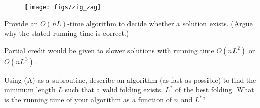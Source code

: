\begin{questions}[start=16]
{       \begin{figure}[h]
           \centering \texttt{[image: figs/zig\_zag]}
       \end{figure}
       
       
       \begin{questions}
           \item {} Provide an $O(nL)$-time algorithm to
           decide whether a solution exists.  (Argue why the stated
           running time is correct.)
           
           Partial credit would be given to slower solutions with
           running time $O(nL^2)$ or $O(n L^3)$.

           
           
           \item {} Using (A) as a subroutine, describe an
           algorithm (as fast as possible) to find the minimum length
           $L$ such that a valid folding exists. 
           $L^*$ of the best folding.  What is the running time of
           your algorithm as a function of $n$ and $L^*$?
       \end{questions}
    }
    
    
    
    
\end{questions}

\HomeworkEnd{}

